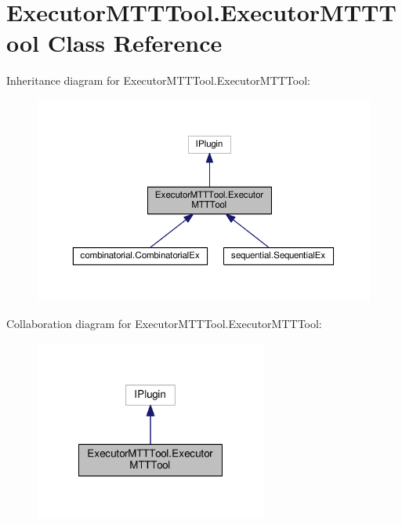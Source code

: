 \hypertarget{class_executor_m_t_t_tool_1_1_executor_m_t_t_tool}{\section{Executor\-M\-T\-T\-Tool.\-Executor\-M\-T\-T\-Tool Class Reference}
\label{class_executor_m_t_t_tool_1_1_executor_m_t_t_tool}
}


Inheritance diagram for Executor\-M\-T\-T\-Tool.\-Executor\-M\-T\-T\-Tool\-:
\nopagebreak
\begin{figure}[H]
\begin{center}
\leavevmode
\includegraphics[width=350pt]{class_executor_m_t_t_tool_1_1_executor_m_t_t_tool__inherit__graph}
\end{center}
\end{figure}


Collaboration diagram for Executor\-M\-T\-T\-Tool.\-Executor\-M\-T\-T\-Tool\-:
\nopagebreak
\begin{figure}[H]
\begin{center}
\leavevmode
\includegraphics[width=216pt]{class_executor_m_t_t_tool_1_1_executor_m_t_t_tool__coll__graph}
\end{center}
\end{figure}
